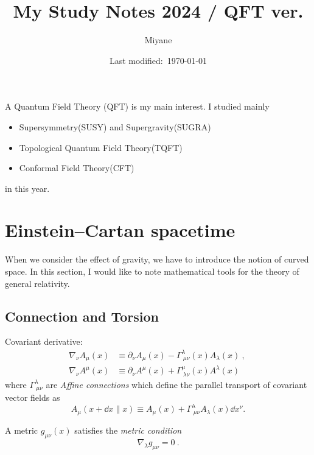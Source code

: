 \documentclass[a4paper,pdftex]{article}
\title{My Study Notes 2024 / QFT ver.}
\author{Miyane}
\date{Last modified:\ \today}
\begin{document}
\maketitle

\tableofcontents

\clearpage

A Quantum Field Theory (QFT) is my main interest. I studied mainly
\begin{itemize}
  \item 
  Supersymmetry(SUSY) and Supergravity(SUGRA)
  \item 
  Topological Quantum Field Theory(TQFT)
  \item 
  Conformal Field Theory(CFT)
\end{itemize}
in this year.

\section{Einstein–Cartan spacetime}

When we consider the effect of gravity, we have to introduce the notion of curved space. In this section, I would like to note mathematical tools for the theory of general relativity.

\subsection{Connection and  Torsion}

Covariant derivative:
\begin{align}
  \nabla_{\nu}A_{\mu}(x)
  &\equiv
  \partial_{\nu}A_{\mu}(x)
  -
  \Gamma^{\lambda}_{\ \mu\nu}(x)A_{\lambda}(x)
  \ ,\ 
  \\
  \nabla_{\nu}A^{\mu}(x)
  &\equiv
  \partial_{\nu}A^{\mu}(x)
  +
  \Gamma^{\mu}_{\ \lambda\nu}(x)A^{\lambda}(x)
\end{align}
where $\Gamma^{\lambda}_{\ \mu\nu}$ are \textit{Affine connections} which define the parallel transport of covariant vector fields as
\begin{equation}
  A_{\mu}(x+\dd x \parallel x)
  \equiv
  A_{\mu}(x)
  +
  \Gamma^{\lambda}_{\ \mu\nu}A_{\lambda}(x)\dd x^{\nu}
  .
\end{equation}

A metric $g_{\mu\nu}(x)$ satisfies the \textit{metric condition}
\begin{equation}
  \nabla_{\lambda}g_{\mu\nu}
  =
  0
  \ .
\end{equation}
\end{document}
